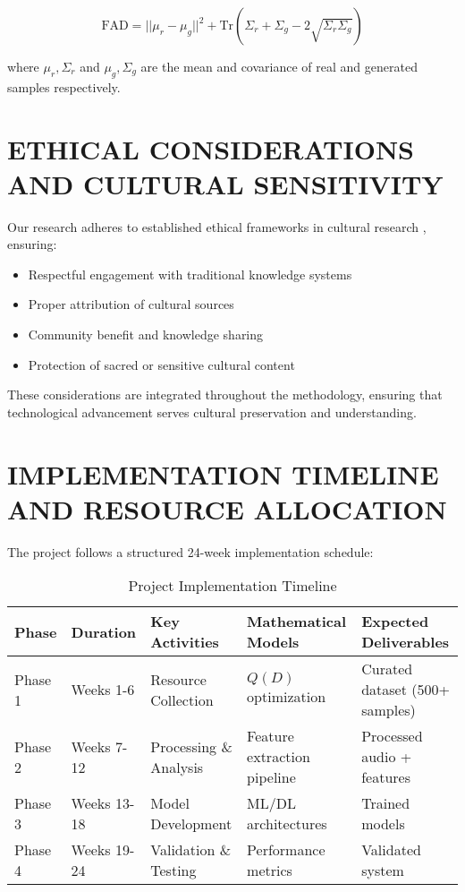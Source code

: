 \documentclass[12pt,a4paper]{article}
\begin{document}
\begin{equation}
\text{FAD} = ||\mu_r - \mu_g||^2 + \text{Tr}\left(\Sigma_r + \Sigma_g - 2\sqrt{\Sigma_r \Sigma_g}\right)
\end{equation}

where $\mu_r, \Sigma_r$ and $\mu_g, \Sigma_g$ are the mean and covariance of real and generated samples respectively.

\section{ETHICAL CONSIDERATIONS AND CULTURAL SENSITIVITY}

Our research adheres to established ethical frameworks in cultural research \citep{brown2003ethics, seeger2004traditional}, ensuring:

\begin{itemize}
\item Respectful engagement with traditional knowledge systems
\item Proper attribution of cultural sources
\item Community benefit and knowledge sharing
\item Protection of sacred or sensitive cultural content
\end{itemize}

These considerations are integrated throughout the methodology, ensuring that technological advancement serves cultural preservation and understanding.

\section{IMPLEMENTATION TIMELINE AND RESOURCE ALLOCATION}

The project follows a structured 24-week implementation schedule:

\begin{table}[h]
\centering
\caption{Project Implementation Timeline}
\begin{tabular}{@{}p{2cm}p{2cm}p{4cm}p{3cm}p{3cm}@{}}
\toprule
\textbf{Phase} & \textbf{Duration} & \textbf{Key Activities} & \textbf{Mathematical Models} & \textbf{Expected Deliverables} \\
\midrule
Phase 1 & Weeks 1-6 & Resource Collection & $Q(D)$ optimization & Curated dataset (500+ samples) \\
Phase 2 & Weeks 7-12 & Processing \& Analysis & Feature extraction pipeline & Processed audio + features \\
Phase 3 & Weeks 13-18 & Model Development & ML/DL architectures & Trained models \\
Phase 4 & Weeks 19-24 & Validation \& Testing & Performance metrics & Validated system \\
\bottomrule
\end{tabular}
\end{table}
\end{document}
